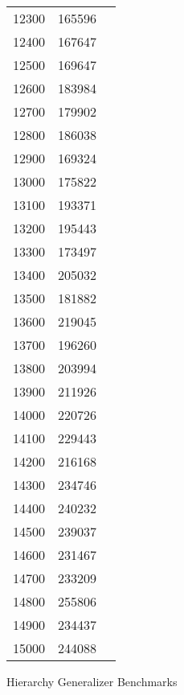 \begin{figure}[H]
\begin{tabular}{r r r}
        12300 & 165596 \\
        12400 & 167647 \\
        12500 & 169647 \\
        12600 & 183984 \\
        12700 & 179902 \\
        12800 & 186038 \\
        12900 & 169324 \\
        13000 & 175822 \\
        13100 & 193371 \\
        13200 & 195443 \\
        13300 & 173497 \\
        13400 & 205032 \\
        13500 & 181882 \\
        13600 & 219045 \\
        13700 & 196260 \\
        13800 & 203994 \\
        13900 & 211926 \\
        14000 & 220726 \\
        14100 & 229443 \\
        14200 & 216168 \\
        14300 & 234746 \\
        14400 & 240232 \\
        14500 & 239037 \\
        14600 & 231467 \\
        14700 & 233209 \\
        14800 & 255806 \\
        14900 & 234437 \\
        15000 & 244088 \\
        \bottomrule
    \end{tabular}
    \caption{Hierarchy Generalizer Benchmarks}
\end{figure}